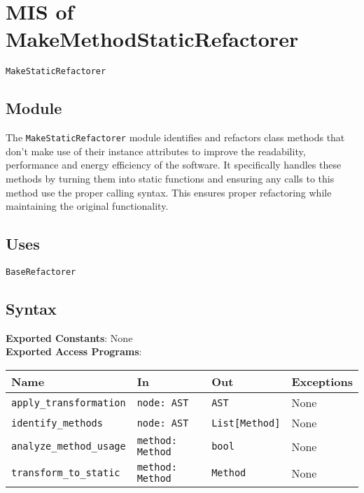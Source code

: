 \documentclass[12pt, titlepage]{article}
\begin{document}
\section{MIS of MakeMethodStaticRefactorer} \label{mis:MakeStatic}

\texttt{MakeStaticRefactorer}

\subsection{Module}

The \texttt{MakeStaticRefactorer} module identifies and refactors 
class methods that don't make use of their instance attributes to improve the readability, performance and energy efficiency of the software. It specifically handles these methods by turning them into static functions and ensuring any calls to this method use the proper calling syntax. This ensures proper refactoring while maintaining the original functionality.

\subsection{Uses}

\texttt{BaseRefactorer}

\subsection{Syntax}

\noindent
\textbf{Exported Constants}: None\\

\noindent
\textbf{Exported Access Programs}:\\

\begin{tabularx}{\linewidth}{|l|>{\raggedright\arraybackslash}X|l|l|}
\hline
\textbf{Name} & \textbf{In} & \textbf{Out} & \textbf{Exceptions} \\\hline
\texttt{apply\_transformation} & \texttt{node: AST} & \texttt{AST} & None \\\hline
\texttt{identify\_methods} & \texttt{node: AST} & \texttt{List[Method]} & None \\\hline
\texttt{analyze\_method\_usage} & \texttt{method: Method} & \texttt{bool} & None \\\hline
\texttt{transform\_to\_static} & \texttt{method: Method} & \texttt{Method} & None \\\hline
\end{tabularx}
\end{document}
